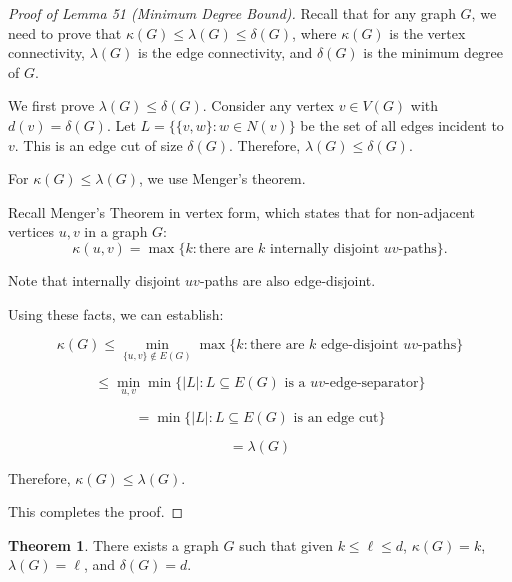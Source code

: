 \documentclass{article}
\theoremstyle{definition}
\newtheorem{theorem}{Theorem}
\begin{document}
\begin{proof}[Proof of Lemma 51 (Minimum Degree Bound)]
Recall that for any graph $G$, we need to prove that $\kappa(G) \leq \lambda(G) \leq \delta(G)$, where $\kappa(G)$ is the vertex connectivity, $\lambda(G)$ is the edge connectivity, and $\delta(G)$ is the minimum degree of $G$.

We first prove $\lambda(G) \leq \delta(G)$. Consider any vertex $v \in V(G)$ with $d(v) = \delta(G)$. 
Let $L = \{\{v,w\} : w \in N(v)\}$ be the set of all edges incident to $v$.
This is an edge cut of size $\delta(G)$.
Therefore, $\lambda(G) \leq \delta(G)$.

For $\kappa(G) \leq \lambda(G)$, we use Menger's theorem.

Recall Menger's Theorem in vertex form, which states that for non-adjacent vertices $u,v$ in a graph $G$:
$$\kappa(u,v) = \max\{ k : \text{there are $k$ internally disjoint $uv$-paths}\}.$$

Note that internally disjoint $uv$-paths are also edge-disjoint.

Using these facts, we can establish:

$$\kappa(G) \leq \min_{\{u,v\} \not\in E(G)} \max\{ k : \text{there are $k$ edge-disjoint $uv$-paths}\}$$

$$\leq \min_{u,v} \min\{ |L| : L \subseteq E(G) \text{ is a $uv$-edge-separator}\}$$

$$= \min\{ |L| : L \subseteq E(G) \text{ is an edge cut}\}$$

$$= \lambda(G)$$

Therefore, $\kappa(G) \leq \lambda(G)$.

This completes the proof.
\end{proof}

\begin{theorem}
There exists a graph $G$ such that given $k \leq \ell \leq d$,
$\kappa(G) = k$, $\lambda(G) = \ell$, and $\delta(G) = d$.
\end{theorem}
\end{document}

